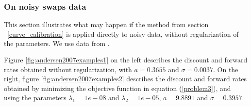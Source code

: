 \subsubsection{On noisy swaps data}
\label{andersen2007examples}

This section illustrates what may happen if the method from section ~\ref{curve_calibration} is applied directly to noisy data, without regularization of the parameters. We use data from \cite{andersen2007discount}.

\medskip

Figure \ref{fig:andersen2007examples1} on the left describes the discount and forward rates obtained without regularization, with $a = 0.3655$ and $\sigma =  0.0037$. On the right, figure \ref{fig:andersen2007examples2} describes the discount and forward rates obtained  by minimizing the objective function in equation (\ref{problem3}), and using the parameters $\lambda_1 = 1e-08$ and $\lambda_2 = 1e-05$, $a = 9.8891$ and $\sigma =  0.3957$.


